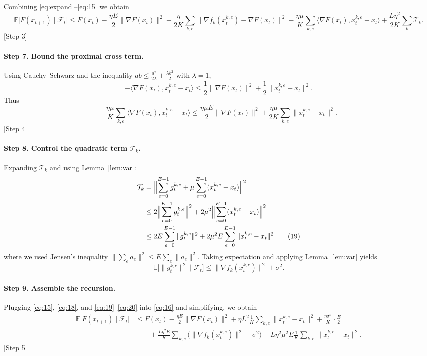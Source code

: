 \documentclass{article}
\newcommand{\E}{\mathbb{E}}
\begin{document}
Combining \eqref{eq:expand}–\eqref{eq:15} we obtain
\[
\E\!\bigl[F(x_{t+1})\mid\mathcal{F}_t\bigr]
\le F(x_t)
-\frac{\eta E}{2}\|\nabla F(x_t)\|^{2}
+\frac{\eta}{2K}\sum_{k,e}
\|\nabla f_k(x_{t}^{k,e})-\nabla F(x_t)\|^{2}
-\frac{\eta\mu}{K}\sum_{k,e}
\bigl\langle\nabla F(x_t),x_{t}^{k,e}-x_t\bigr\rangle
+ \frac{L\eta^{2}}{2K}\sum_{k}\mathcal{T}_k .
\tag{16}
\]
[Step 3]

\paragraph{Step 7. Bound the proximal cross term.}
Using Cauchy–Schwarz and the inequality $ab\le \frac{a^{2}}{2\lambda}+\frac{\lambda b^{2}}{2}$ with $\lambda=1$,
\[
-\bigl\langle\nabla F(x_t),x_{t}^{k,e}-x_t\bigr\rangle
\le \frac12\|\nabla F(x_t)\|^{2}
+\frac12\|x_{t}^{k,e}-x_t\|^{2}.
\tag{17}
\]
Thus
\[
-\frac{\eta\mu}{K}\sum_{k,e}
\bigl\langle\nabla F(x_t),x_{t}^{k,e}-x_t\bigr\rangle
\le \frac{\eta\mu E}{2}\|\nabla F(x_t)\|^{2}
+\frac{\eta\mu}{2K}\sum_{k,e}\|x_{t}^{k,e}-x_t\|^{2}.
\tag{18}
\]
[Step 4]

\paragraph{Step 8. Control the quadratic term $\mathcal{T}_k$.}
Expanding $\mathcal{T}_k$ and using Lemma~\ref{lem:var}:
\begin{align}
\mathcal{T}_k
&= \Bigl\|\sum_{e=0}^{E-1}g_{t}^{k,e}
+\mu\sum_{e=0}^{E-1}(x_{t}^{k,e}-x_t)\Bigr\|^{2}\nonumber\\
&\le 2\Bigl\|\sum_{e=0}^{E-1}g_{t}^{k,e}\Bigr\|^{2}
+2\mu^{2}\Bigl\|\sum_{e=0}^{E-1}(x_{t}^{k,e}-x_t)\Bigr\|^{2}\nonumber\\
&\le 2E\sum_{e=0}^{E-1}\|g_{t}^{k,e}\|^{2}
+2\mu^{2}E\sum_{e=0}^{E-1}\|x_{t}^{k,e}-x_t\|^{2}
\tag{19}
\end{align}
where we used Jensen’s inequality $\|\sum_{e}a_e\|^{2}\le E\sum_{e}\|a_e\|^{2}$.
Taking expectation and applying Lemma~\ref{lem:var} yields
\[
\E\!\bigl[\|g_{t}^{k,e}\|^{2}\mid\mathcal{F}_t\bigr]
\le \|\nabla f_k(x_{t}^{k,e})\|^{2}+\sigma^{2}.
\tag{20}
\]

\paragraph{Step 9. Assemble the recursion.}
Plugging \eqref{eq:15}, \eqref{eq:18}, and \eqref{eq:19}–\eqref{eq:20} into \eqref{eq:16} and simplifying, we obtain
\begin{align}
\E\!\bigl[F(x_{t+1})\mid\mathcal{F}_t\bigr]
&\le F(x_t)
-\frac{\eta E}{2}\|\nabla F(x_t)\|^{2}
+\eta L^{2}\frac{1}{K}\sum_{k,e}\|x_{t}^{k,e}-x_t\|^{2}
+\frac{\eta\sigma^{2}}{K}\cdot\frac{E}{2} \nonumber\\
&\qquad
+\frac{L\eta^{2}E}{K}\sum_{k,e}
\bigl(\|\nabla f_k(x_{t}^{k,e})\|^{2}+\sigma^{2}\bigr)
+L\eta^{2}\mu^{2}E\frac{1}{K}\sum_{k,e}\|x_{t}^{k,e}-x_t\|^{2}.
\tag{21}
\end{align}
[Step 5]
\end{document}
